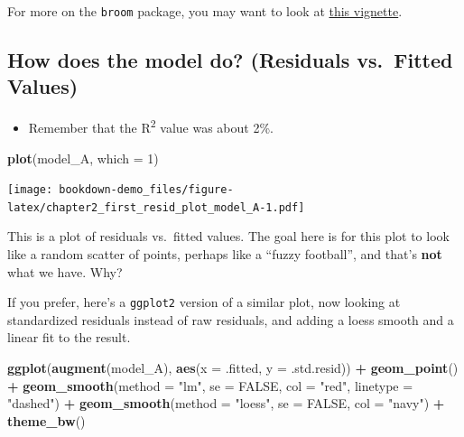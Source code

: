 \documentclass[]{book}
\newenvironment{Shaded}{\begin{snugshade}}{\end{snugshade}}
\newcommand{\KeywordTok}[1]{\textcolor[rgb]{0.13,0.29,0.53}{\textbf{#1}}}
\newcommand{\DataTypeTok}[1]{\textcolor[rgb]{0.13,0.29,0.53}{#1}}
\newcommand{\DecValTok}[1]{\textcolor[rgb]{0.00,0.00,0.81}{#1}}
\newcommand{\StringTok}[1]{\textcolor[rgb]{0.31,0.60,0.02}{#1}}
\newcommand{\OtherTok}[1]{\textcolor[rgb]{0.56,0.35,0.01}{#1}}
\newcommand{\OperatorTok}[1]{\textcolor[rgb]{0.81,0.36,0.00}{\textbf{#1}}}
\newcommand{\NormalTok}[1]{#1}
\providecommand{\tightlist}{%
  \setlength{\itemsep}{0pt}\setlength{\parskip}{0pt}}
\theoremstyle{definition}
\theoremstyle{definition}
\theoremstyle{definition}
\theoremstyle{remark}
\begin{document}
For more on the \texttt{broom} package, you may want to look at
\href{https://cran.r-project.org/web/packages/broom/vignettes/broom.html}{this
vignette}.

\subsection{How does the model do? (Residuals vs.~Fitted
Values)}\label{how-does-the-model-do-residuals-vs.fitted-values}

\begin{itemize}
\tightlist
\item
  Remember that the R\textsuperscript{2} value was about 2\%.
\end{itemize}

\begin{Shaded}
\begin{Highlighting}[]
\KeywordTok{plot}\NormalTok{(model_A, }\DataTypeTok{which =} \DecValTok{1}\NormalTok{)}
\end{Highlighting}
\end{Shaded}

\texttt{[image: bookdown-demo\_files/figure-latex/chapter2\_first\_resid\_plot\_model\_A-1.pdf]}

This is a plot of residuals vs.~fitted values. The goal here is for this
plot to look like a random scatter of points, perhaps like a ``fuzzy
football'', and that's \textbf{not} what we have. Why?

If you prefer, here's a \texttt{ggplot2} version of a similar plot, now
looking at standardized residuals instead of raw residuals, and adding a
loess smooth and a linear fit to the result.

\begin{Shaded}
\begin{Highlighting}[]
\KeywordTok{ggplot}\NormalTok{(}\KeywordTok{augment}\NormalTok{(model_A), }\KeywordTok{aes}\NormalTok{(}\DataTypeTok{x =}\NormalTok{ .fitted, }\DataTypeTok{y =}\NormalTok{ .std.resid)) }\OperatorTok{+}
\StringTok{    }\KeywordTok{geom_point}\NormalTok{() }\OperatorTok{+}
\StringTok{    }\KeywordTok{geom_smooth}\NormalTok{(}\DataTypeTok{method =} \StringTok{"lm"}\NormalTok{, }\DataTypeTok{se =} \OtherTok{FALSE}\NormalTok{, }\DataTypeTok{col =} \StringTok{"red"}\NormalTok{, }\DataTypeTok{linetype =} \StringTok{"dashed"}\NormalTok{) }\OperatorTok{+}
\StringTok{    }\KeywordTok{geom_smooth}\NormalTok{(}\DataTypeTok{method =} \StringTok{"loess"}\NormalTok{, }\DataTypeTok{se =} \OtherTok{FALSE}\NormalTok{, }\DataTypeTok{col =} \StringTok{"navy"}\NormalTok{) }\OperatorTok{+}
\StringTok{    }\KeywordTok{theme_bw}\NormalTok{()}
\end{Highlighting}
\end{Shaded}
\end{document}
